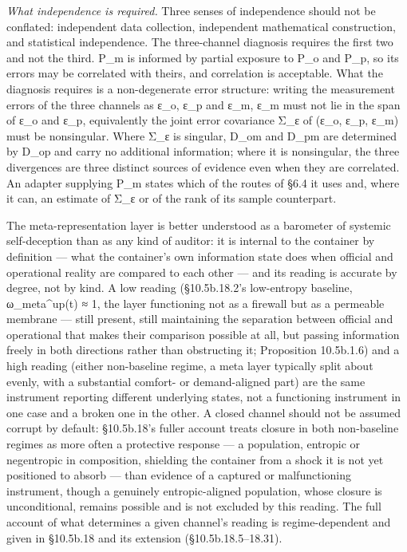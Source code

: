 \documentclass[
]{article}
\begin{document}
\emph{What independence is required.} Three senses of independence
should not be conflated: independent data collection, independent
mathematical construction, and statistical independence. The
three-channel diagnosis requires the first two and not the third. P\_m
is informed by partial exposure to P\_o and P\_p, so its errors may be
correlated with theirs, and correlation is acceptable. What the
diagnosis requires is a non-degenerate error structure: writing the
measurement errors of the three channels as ε\_o, ε\_p and ε\_m, ε\_m
must not lie in the span of ε\_o and ε\_p, equivalently the joint error
covariance Σ\_ε of (ε\_o, ε\_p, ε\_m) must be nonsingular. Where Σ\_ε is
singular, D\_om and D\_pm are determined by D\_op and carry no
additional information; where it is nonsingular, the three divergences
are three distinct sources of evidence even when they are correlated. An
adapter supplying P\_m states which of the routes of §6.4 it uses and,
where it can, an estimate of Σ\_ε or of the rank of its sample
counterpart.

The meta-representation layer is better understood as a barometer of
systemic self-deception than as any kind of auditor: it is internal to
the container by definition --- what the container's own information
state does when official and operational reality are compared to each
other --- and its reading is accurate by degree, not by kind. A low
reading (§10.5b.18.2's low-entropy baseline, ω\_meta\^{}up(t) ≈ 1, the
layer functioning not as a firewall but as a permeable membrane ---
still present, still maintaining the separation between official and
operational that makes their comparison possible at all, but passing
information freely in both directions rather than obstructing it;
Proposition 10.5b.1.6) and a high reading (either non-baseline regime, a
meta layer typically split about evenly, with a substantial comfort- or
demand-aligned part) are the same instrument reporting different
underlying states, not a functioning instrument in one case and a broken
one in the other. A closed channel should not be assumed corrupt by
default: §10.5b.18's fuller account treats closure in both non-baseline
regimes as more often a protective response --- a population, entropic
or negentropic in composition, shielding the container from a shock it
is not yet positioned to absorb --- than evidence of a captured or
malfunctioning instrument, though a genuinely entropic-aligned
population, whose closure is unconditional, remains possible and is not
excluded by this reading. The full account of what determines a given
channel's reading is regime-dependent and given in §10.5b.18 and its
extension (§10.5b.18.5--18.31).
\end{document}
